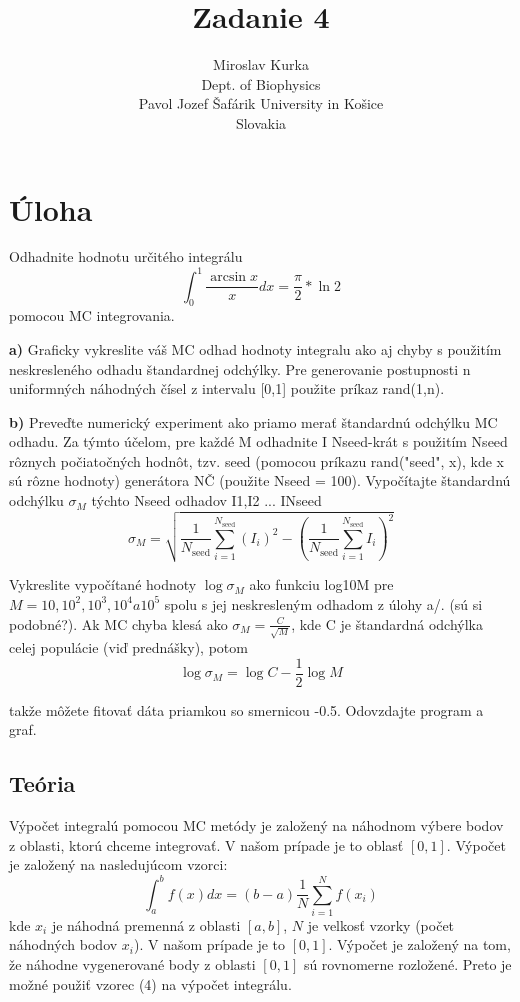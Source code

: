 \documentclass{article}
\title{Zadanie 4}
\author{Miroslav Kurka\\
  \small Dept. of Biophysics\\
  \small Pavol Jozef Šafárik University in Košice\\
  \small Slovakia 
}
\theoremstyle{definition}
\theoremstyle{remark}
\begin{document}
\maketitle


\section{Úloha}

Odhadnite hodnotu určitého integrálu
\begin{equation}
    \int_{0}^{1} \frac{\arcsin{x}}{x} dx = \frac{\pi}{2} * \ln{2} 
\end{equation}
pomocou MC integrovania. 



\textbf{a)} Graficky vykreslite váš MC odhad hodnoty integralu ako aj chyby s použitím
neskresleného odhadu štandardnej odchýlky. Pre generovanie postupnosti n uniformných náhodných čísel z intervalu [0,1]
použite príkaz rand(1,n).


\textbf{b)} Preveďte numerický experiment ako priamo merať štandardnú odchýlku MC odhadu. Za
týmto účelom, pre každé M odhadnite I Nseed-krát s použitím Nseed rôznych počiatočných
hodnôt, tzv. seed (pomocou príkazu rand("seed", x), kde x sú rôzne hodnoty)
generátora NČ (použite Nseed = 100). Vypočítajte štandardnú odchýlku $\sigma_M$ týchto Nseed
odhadov I1,I2 ... INseed
\begin{equation}
    \sigma_M = \sqrt{\frac{1}{N_{\text{seed}}} \sum_{i=1}^{N_{\text{seed}}} (I_i)^2 - \left(\frac{1}{N_{\text{seed}}} \sum_{i=1}^{N_{\text{seed}}} I_i\right)^2}
\end{equation}
    
Vykreslite vypočítané hodnoty $\log{\sigma_M}$ ako funkciu log10M pre $M = 10, 10^2, 10^3, 10^4 a 10^5$
spolu s jej neskresleným odhadom z úlohy a/. (sú si podobné?). Ak MC chyba klesá ako
$\sigma_M=\frac{C}{\sqrt{M}}$, kde C je štandardná odchýlka celej populácie (viď prednášky), potom
\begin{equation}
    \log{\sigma_M} = \log{C} - \frac{1}{2} \log{M}
\end{equation}

takže môžete fitovať dáta priamkou so smernicou -0.5. Odovzdajte program a graf.


\subsection{Teória}\label{sec:nothing}

Výpočet integralú pomocou MC metódy je založený na náhodnom výbere bodov z oblasti, ktorú chceme integrovať\cite{Zukovic}. V našom prípade je to oblasť $[0,1]$. Výpočet je založený na nasledujúcom vzorci:
\begin{equation}
    \int_{a}^{b} f(x) dx = (b-a) \frac{1}{N} \sum_{i=1}^{N} f(x_i)
\end{equation}
kde $x_i$ je náhodná premenná z oblasti $[a,b]$, $N$ je velkosť vzorky (počet náhodných bodov $x_i$). V našom prípade je to $[0,1]$. Výpočet je založený na tom, že náhodne vygenerované body z oblasti $[0,1]$ sú rovnomerne rozložené. Preto je možné použiť vzorec (4) na výpočet integrálu. 
\end{document}
